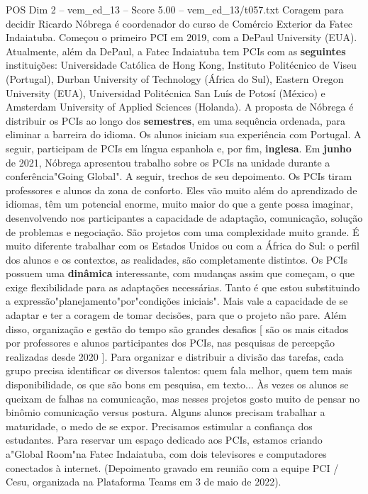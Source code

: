 \begin{textsample}{POS Dim 2 – vem\_ed\_13 – Score 5.00 – vem\_ed\_13/t057.txt}  \label{ex:f2_pos_073}
Coragem para decidir Ricardo Nóbrega é coordenador do curso de Comércio Exterior da Fatec Indaiatuba.
Começou o primeiro PCI em 2019, com a DePaul University (EUA).
Atualmente, além da DePaul, a Fatec Indaiatuba tem PCIs com as \textbf{seguintes} instituições: Universidade Católica de Hong Kong, Instituto Politécnico de Viseu (Portugal), Durban University of Technology (África do Sul), Eastern Oregon University (EUA), Universidad Politécnica San Luís de Potosí (México) e Amsterdam University of Applied Sciences (Holanda).
A proposta de Nóbrega é distribuir os PCIs ao longo dos \textbf{semestres}, em uma sequência ordenada, para eliminar a barreira do idioma.
Os alunos iniciam sua experiência com Portugal.
A seguir, participam de PCIs em língua espanhola e, por fim, \textbf{inglesa}.
Em \textbf{junho} de 2021, Nóbrega apresentou trabalho sobre os PCIs na unidade durante a conferência"Going Global".
A seguir, trechos de seu depoimento.
Os PCIs tiram professores e alunos da zona de conforto.
Eles vão muito além do aprendizado de idiomas, têm um potencial enorme, muito maior do que a gente possa imaginar, desenvolvendo nos participantes a capacidade de adaptação, comunicação, solução de problemas e negociação.
São projetos com uma complexidade muito grande.
É muito diferente trabalhar com os Estados Unidos ou com a África do Sul: o perfil dos alunos e os contextos, as realidades, são completamente distintos.
Os PCIs possuem uma \textbf{dinâmica} interessante, com mudanças assim que começam, o que exige flexibilidade para as adaptações necessárias.
Tanto é que estou substituindo a expressão"planejamento"por"condições iniciais".
Mais vale a capacidade de se adaptar e ter a coragem de tomar decisões, para que o projeto não pare.
Além disso, organização e gestão do tempo são grandes desafios [ são os mais citados por professores e alunos participantes dos PCIs, nas pesquisas de percepção realizadas desde 2020 ].
Para organizar e distribuir a divisão das tarefas, cada grupo precisa identificar os diversos talentos: quem fala melhor, quem tem mais disponibilidade, os que são bons em pesquisa, em texto... Às vezes os alunos se queixam de falhas na comunicação, mas nesses projetos gosto muito de pensar no binômio comunicação versus postura.
Alguns alunos precisam trabalhar a maturidade, o medo de se expor.
Precisamos estimular a confiança dos estudantes.
Para reservar um espaço dedicado aos PCIs, estamos criando a"Global Room"na Fatec Indaiatuba, com dois televisores e computadores conectados à internet. (Depoimento gravado em reunião com a equipe PCI / Cesu, organizada na Plataforma Teams em 3 de maio de 2022).

\end{textsample}
